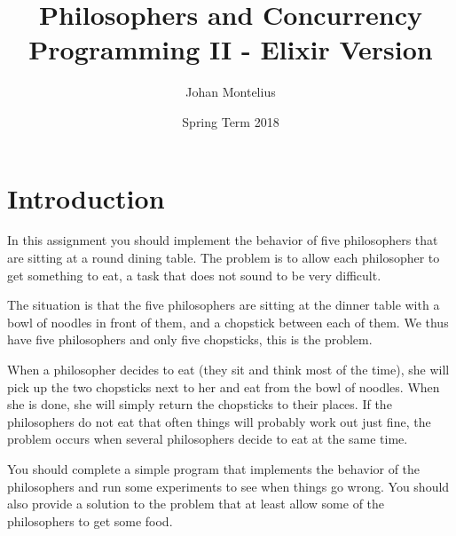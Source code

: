 \documentclass[a4paper,11pt]{article}
\begin{document}
    
    
    \title{
        \textbf{Philosophers and Concurrency}\\
        \large{Programming II - Elixir Version}
    }
    \author{Johan Montelius}
    \date{Spring Term 2018}
    \maketitle
    \thispagestyle{fancy}
    
    
    
    \section*{Introduction}
    
    In this assignment you should implement the behavior of five
    philosophers that are sitting at a round dining table. The problem is to
    allow each philosopher to get something to eat, a task that does not
    sound to be very difficult. 
    
    The situation is that the five philosophers are sitting at the dinner
    table with a bowl of noodles in front of them, and a chopstick
    between each of them. We thus have five philosophers and only five
    chopsticks, this is the problem.
    
    When a philosopher decides to eat (they sit and think most of the
    time), she will pick up the two chopsticks next to her and eat from
    the bowl of noodles. When she is done, she will simply return the
    chopsticks to their places. If the philosophers do not eat that often
    things will probably work out just fine, the problem occurs when
    several philosophers decide to eat at the same time.
    
    You should complete a simple program that implements the behavior
    of the philosophers and run some experiments to see when things go
    wrong. You should also provide a solution to the problem that at least
    allow some of the philosophers to get some food.  
    
    
    
\end{document}
